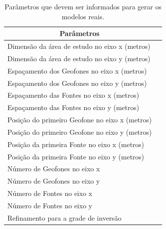 \documentclass[a4paper, 12 pt]{article} %
\begin{document}
\begin{table}[!hbtp]
	\caption{Parâmetros que devem ser informados para gerar os modelos reais.}
	\centering
	\label{parametros_campo}
	\begin{tabular}{@{}ll@{}}
		\toprule
		\multicolumn{1}{c}{Parâmetros} &  \\ \midrule
		\rowcolor[HTML]{EFEFEF} 
		Dimensão da área de estudo no eixo x (metros)   
		&   
		\\
		Dimensão da área de estudo no eixo y (metros)   
		& 
		\\
		\rowcolor[HTML]{EFEFEF} 
		Espaçamento dos Geofones no eixo x (metros) &           
		\\
		Espaçamento dos Geofones no eixo y (metros)         &           
		\\
		\rowcolor[HTML]{EFEFEF} 
		Espaçamento das Fontes no eixo x (metros)    &                   
		\\
		Espaçamento das Fontes no eixo y (metros)           &    
		\\
		\rowcolor[HTML]{EFEFEF} 
		Posição do primeiro Geofone no eixo x (metros)    &                   
		\\
		Posição do primeiro Geofone no eixo y (metros)    &    
		\\
		\rowcolor[HTML]{EFEFEF} 
		Posição da primeira Fonte no eixo x (metros)    &                   
		\\
		Posição da primeira Fonte no eixo y (metros)        &    
		\\
		\rowcolor[HTML]{EFEFEF} 
		Número de Geofones no eixo x     &                   
		\\
		Número de Geofones no eixo y
		&    
		\\
		\rowcolor[HTML]{EFEFEF} 
		Número de Fontes no eixo x     
		&                   
		\\
		Número de Fontes no eixo y
		&    
		\\
		\rowcolor[HTML]{EFEFEF} 
		Refinamento para a grade de inversão     
		&                   	
		                          \\ \bottomrule
	\end{tabular}
\end{table}
\end{document}
